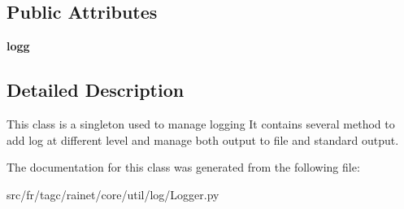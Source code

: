 \subsection*{Public Attributes}
\begin{DoxyCompactItemize}
\item 
\hypertarget{classsrc_1_1fr_1_1tagc_1_1rainet_1_1core_1_1util_1_1log_1_1Logger_1_1Logger_a4602026d1e48039f2ba504e357c095aa}{}{\bfseries logg}\label{classsrc_1_1fr_1_1tagc_1_1rainet_1_1core_1_1util_1_1log_1_1Logger_1_1Logger_a4602026d1e48039f2ba504e357c095aa}

\end{DoxyCompactItemize}


\subsection{Detailed Description}
This class is a singleton used to manage logging It contains several method to add log at different level and manage both output to file and standard output. 

The documentation for this class was generated from the following file\+:\begin{DoxyCompactItemize}
\item 
src/fr/tagc/rainet/core/util/log/Logger.\+py\end{DoxyCompactItemize}
